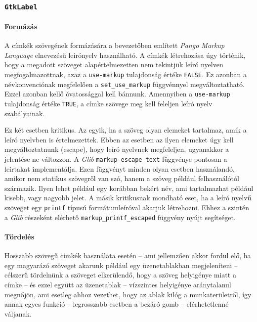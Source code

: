 \subsubsection{\texttt{GtkLabel}}

\paragraph{Formázás}

A címkék szövegének formázására a bevezetőben említett \textit{Pango Markup Language} elnevezésű leírónyelv használható. A címkék létrehozása úgy történik, hogy a megadott szöveget alapértelmezetten nem tekintjük leíró nyelven megfogalmazottnak, azaz a \texttt{use-markup} tulajdonság értéke \texttt{FALSE}. Ez azonban a névkonvenciónak megfelelően a \texttt{set\_use\_markup} függvénnyel megváltoztatható. Ezzel azonban kellő óvatossággal kell bánnunk. Amennyiben a \texttt{use-markup} tulajdonság értéke \texttt{TRUE}, a címke szövege meg kell feleljen leíró nyelv szabályainak.

Ez két esetben kritikus. Az egyik, ha a szöveg olyan elemeket tartalmaz, amik a leíró nyelvben is értelmezettek. Ebben az esetben az ilyen elemeket úgy kell megváltoztatnunk (escape), hogy leíró nyelvnek megfeleljen, ugyanakkor a jelentése ne változzon. A \textit{Glib} \texttt{markup\_escape\_text} függvénye pontosan a leírtakat implementálja. Ezen függvényt minden olyan esetben használandó, amikor nem statikus szövegről van szó, hanem a szöveg például felhasználótól származik. Ilyen lehet például egy korábban bekért név, ami tartalmazhat például kisebb, vagy nagyobb jelet. A másik kritikusnak mondható eset, ha a leíró nyelvű szöveget egy \texttt{printf} típusú formátumleíróval akarjuk létrehozni. Ehhez a szintén a \textit{Glib} részeként elérhető \texttt{markup\_printf\_escaped} függvény nyújt segítséget.

\paragraph{Tördelés}

Hosszabb szövegű címkék használata esetén -- ami jellemzően akkor fordul elő, ha egy magyarázó szöveget akarunk például egy üzenetablakban megjeleníteni -- célszerű tördelnünk a szöveget elkerülendő, hogy a szöveg helyigénye miatt a címke -- és ezzel együtt az üzenetablak -- vízszintes helyigénye aránytalanul megnőjön, ami esetleg ahhoz vezethet, hogy az ablak kilóg a munkaterületről, így annak egyes funkció -- legrosszabb esetben a bezáró gomb -- elérhetetlenné váljanak.

